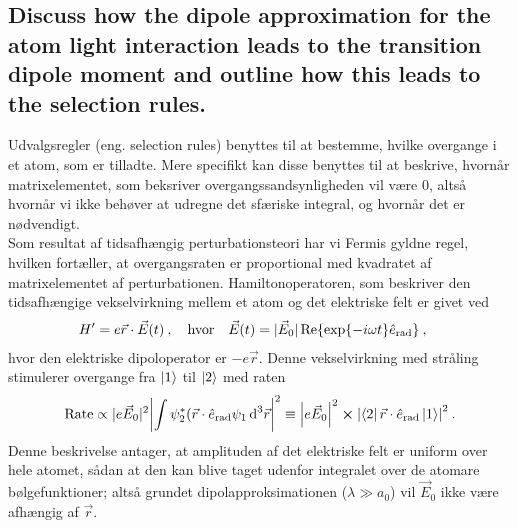 \subsection{Discuss how the dipole approximation for the atom light interaction leads to the transition dipole moment and outline how this leads to the selection rules.}


Udvalgsregler (eng. selection rules) benyttes til at bestemme, hvilke overgange i et atom, som er tilladte. Mere specifikt kan disse benyttes til at beskrive, hvornår matrixelementet, som beksriver overgangssandsynligheden vil være 0, altså hvornår vi ikke behøver at udregne det sfæriske integral, og hvornår det er nødvendigt.\\

Som resultat af tidsafhængig perturbationsteori har vi Fermis gyldne regel, hvilken fortæller, at overgangsraten er proportional med kvadratet af matrixelementet af perturbationen. Hamiltonoperatoren, som beskriver den tidsafhængige vekselvirkning mellem et atom og det elektriske felt er givet ved
\begin{align}
    H' &= e\Vec{r} \cdot \Vec{E}(t) \: , \quad \text{hvor} \quad \Vec{E}(t) = |\Vec{E}_0|\Re{\exp{-i\omega t}\Hat{e}_\text{rad}} \: ,
\end{align}
hvor den elektriske dipoloperator er $-e\Vec{r}$. Denne vekselvirkning med stråling stimulerer overgange fra $\ket{1}$ til $\ket{2}$ med raten
\begin{align}
    \text{Rate} \propto |e\Vec{E}_0|^2 \abs{\int \psi_2^* (\Vec{r} \cdot \Hat{e}_\text{rad} \psi_1 \, \text{d}^3\Vec{r}}^2 \equiv \abs{e\Vec{E}_0}^2 \cross \abs{\bra{2}\Vec{r}\cdot\Hat{e}_\text{rad}\ket{1}}^2 \: .
\end{align}
Denne beskrivelse antager, at amplituden af det elektriske felt er uniform over hele atomet, sådan at den kan blive taget udenfor integralet over de atomare bølgefunktioner; altså grundet \textsf{dipolapproksimationen} ($\lambda \gg a_0$) vil $\Vec{E}_0$ ikke være afhængig af $\Vec{r}$.


